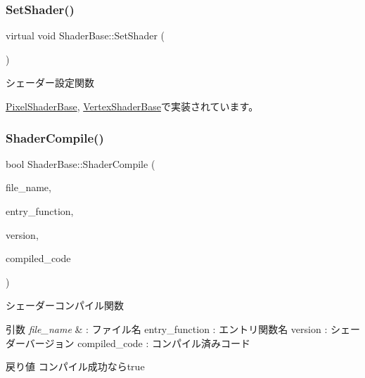\subsubsection{\texorpdfstring{Set\+Shader()}{SetShader()}}
{\footnotesize\ttfamily virtual void Shader\+Base\+::\+Set\+Shader (\begin{DoxyParamCaption}{ }\end{DoxyParamCaption})\hspace{0.3cm}{\ttfamily [pure virtual]}}



シェーダー設定関数 



\mbox{\hyperlink{class_pixel_shader_base_a73f41bda5cbb9309ad415cdc471954a2}{Pixel\+Shader\+Base}}, \mbox{\hyperlink{class_vertex_shader_base_a9f93697c5668852850f0a7b7ef7cb67f}{Vertex\+Shader\+Base}}で実装されています。

\mbox{\label{class_shader_base_ac6e791440374f97592cfb4cb36f4fa55}} 
\subsubsection{\texorpdfstring{Shader\+Compile()}{ShaderCompile()}}
{\footnotesize\ttfamily bool Shader\+Base\+::\+Shader\+Compile (\begin{DoxyParamCaption}\item[{const char $\ast$}]{file\+\_\+name,  }\item[{const char $\ast$}]{entry\+\_\+function,  }\item[{const char $\ast$}]{version,  }\item[{L\+P\+D3\+D\+X\+B\+U\+F\+F\+ER $\ast$}]{compiled\+\_\+code }\end{DoxyParamCaption})\hspace{0.3cm}{\ttfamily [inline]}}



シェーダーコンパイル関数 


\begin{DoxyParams}{引数}
{\em file\+\_\+name} & \+: ファイル名 entry\+\_\+function \+: エントリ関数名 version \+: シェーダーバージョン compiled\+\_\+code \+: コンパイル済みコード \\
\hline
\end{DoxyParams}
\begin{DoxyReturn}{戻り値}
コンパイル成功ならtrue 
\end{DoxyReturn}


